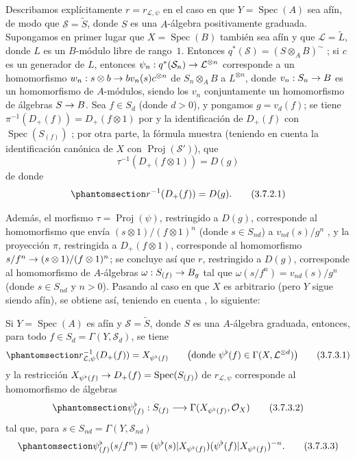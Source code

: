 \documentclass[oneside,10pt]{amsart}
\makeatletter
\newcommand{\ega@arrow}[2]{\mathchoice{#1}{#2}{#2}{#2}}
\renewcommand{\to}{\ega@arrow{\longrightarrow}{\rightarrow}}
\let\EGAOriginalLabel\label
\renewcommand{\label}[1]{\phantomsection\EGAOriginalLabel{#1}}
\makeatother
\begin{document}
\begin{env}[3.7.2]
\label{II.3.7.2-fr}
Describamos explícitamente $r=r_{\mathcal{L},\psi}$ en el caso en que $Y=\operatorname{Spec}(A)$ sea afín, de modo que $\mathcal{S}=\widetilde{S}$, donde $S$ es una $A$-álgebra positivamente graduada.
Supongamos en primer lugar que $X=\operatorname{Spec}(B)$ también sea afín y que $\mathcal{L}=\widetilde{L}$, donde $L$ es un $B$-módulo libre de rango~$1$.
Entonces $q^*(\mathcal{S})=(S\otimes_AB)^{\sim}$ ;
si $c$ es un generador de $L$, entonces $\psi_n:q^*(\mathcal{S}_n)\to\mathcal{L}^{\otimes n}$ corresponde a un homomorfismo $w_n:s\otimes b\to bv_n(s)c^{\otimes n}$ de $S_n\otimes_AB$ a $L^{\otimes n}$, donde $v_n:S_n\to B$ es un homomorfismo de $A$-módulos, siendo los $v_n$ conjuntamente un homomorfismo de álgebras $S\to B$.
Sea $f\in S_d$ (donde $d>0$), y pongamos $g=v_d(f)$;
se tiene $\pi^{-1}(D_+(f))=D_+(f\otimes1)$ por  y la identificación de $D_+(f)$ con $\operatorname{Spec}(S_{(f)})$ ;
por otra parte, la fórmula  muestra (teniendo en cuenta la identificación canónica de $X$ con $\operatorname{Proj}(\mathcal{S}')$), que
\[
  \tau^{-1}(D_+(f\otimes1))=D(g)
\]
de donde
\[
\label{II.3.7.2.1-fr}
  r^{-1}(D_+(f))=D(g).
\tag{3.7.2.1}
\]

Además, el morfismo $\tau=\operatorname{Proj}(\psi)$, restringido a $D(g)$, corresponde al homomorfismo que envía $(s\otimes1)/(f\otimes1)^n$ (donde $s\in S_{nd}$) a $v_{nd}(s)/g^n$ , y la proyección $\pi$, restringida a $D_+(f\otimes1)$, corresponde al homomorfismo $s/f^n\to(s\otimes1)/(f\otimes1)^n$;
se concluye así que $r$, restringido a $D(g)$, corresponde al homomorfismo de $A$-álgebras $\omega:S_{(f)}\to B_g$ tal que $\omega(s/f^n)=v_{nd}(s)/g^n$ (donde $s\in S_{nd}$ y $n>0$).
Pasando al caso en que $X$ es arbitrario (pero $Y$ sigue siendo afín), se obtiene así, teniendo en cuenta , lo siguiente:
\end{env}

\begin{proposition}[3.7.3]
\label{II.3.7.3-fr}
Si $Y=\operatorname{Spec}(A)$ es afín y $\mathcal{S}=\widetilde{S}$, donde $S$ es una $A$-álgebra graduada, entonces, para todo $f\in S_d=\Gamma(Y,\mathcal{S}_d)$, se tiene
\[
\label{II.3.7.3.1-fr}
  r_{\mathcal{L},\psi}^{-1}(D_+(f))=X_{\psi^\flat(f)}
  \qquad\bigl(\text{donde }\psi^\flat(f)\in
  \Gamma(X,\mathcal{L}^{\otimes d})\bigr)
\tag{3.7.3.1}
\] y la restricción $X_{\psi^\flat(f)}\to D_+(f)=\operatorname{Spec}(S_{(f)})$ de $r_{\mathcal{L},\psi}$ corresponde  al homomorfismo de álgebras
\[
\label{II.3.7.3.2-fr}
  \psi_{(f)}^\flat:S_{(f)}\longrightarrow
  \Gamma(X_{\psi^\flat(f)},\mathcal{O}_X)
\tag{3.7.3.2}
\]
tal que, para $s\in S_{nd}=\Gamma(Y,\mathcal{S}_{nd})$
\[
\label{II.3.7.3.3-fr}
  \psi_{(f)}^\flat(s/f^n)
  =(\psi^\flat(s)|X_{\psi^\flat(f)})
   (\psi^\flat(f)|X_{\psi^\flat(f)})^{-n}.
\tag{3.7.3.3}
\]
\end{proposition}
\end{document}
